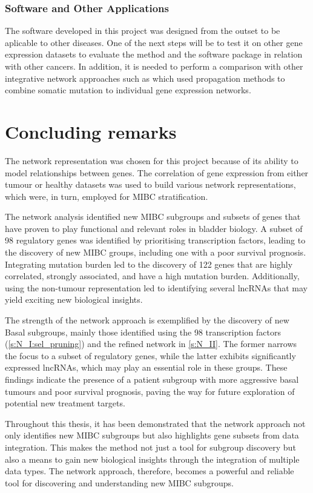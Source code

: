 \subsubsection*{Software and Other Applications}

The software developed in this project was designed from the outset to be aplicable to other diseases. One of the next steps will be to test it on other gene expression datasets to evaluate the method and the software package in relation with other cancers. In addition, it is needed to perform a comparison with other integrative network approaches such as \citet{Hofree2013-ld,He2017-dj} which used propagation methods to combine somatic mutation to individual gene expression networks.


\section{Concluding remarks}

The network representation was chosen for this project because of its ability to model relationships between genes. The correlation of gene expression from either tumour or healthy datasets was used to build various network representations, which were, in turn, employed for MIBC stratification.


The network analysis identified new MIBC subgroups and subsets of genes that have proven to play functional and relevant roles in bladder biology. A subset of 98 regulatory genes was identified by prioritising transcription factors, leading to the discovery of new MIBC groups, including one with a poor survival prognosis. Integrating mutation burden led to the discovery of 122 genes that are highly correlated, strongly associated, and have a high mutation burden. Additionally, using the non-tumour representation led to identifying several lncRNAs that may yield exciting new biological insights.

% 
The strength of the network approach is exemplified by the discovery of new Basal subgroups, mainly those identified using the 98 transcription factors (\cref{s:N_I:sel_pruning}) and the refined network in \cref{s:N_II}. The former narrows the focus to a subset of regulatory genes, while the latter exhibits significantly expressed lncRNAs, which may play an essential role in these groups. These findings indicate the presence of a patient subgroup with more aggressive basal tumours and poor survival prognosis, paving the way for future exploration of potential new treatment targets.

Throughout this thesis, it has been demonstrated that the network approach not only identifies new MIBC subgroups but also highlights gene subsets from data integration. This makes the method not just a tool for subgroup discovery but also a means to gain new biological insights through the integration of multiple data types. The network approach, therefore, becomes a powerful and reliable tool for discovering and understanding new MIBC subgroups.